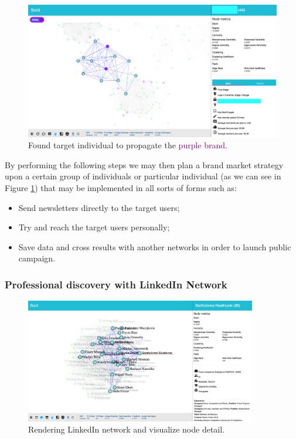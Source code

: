 \begin{figure}[h!]
\begin{center}
  \hspace*{-0.8in}
  \includegraphics[width=1.2\textwidth]{img/socii/socii_14.png}
\end{center}
\caption{\label{img:socii_14} Found target individual to propagate the \textcolor{purple}{purple brand}.}
\end{figure}

By performing the following steps we may then plan a brand market strategy upon a certain group of individuals or particular individual (as we can see in Figure \ref{img:socii_14}) that may be implemented in all sorts of forms such as:
\begin{itemize}
    \item Send newsletters directly to the target users;
    \item Try and reach the target users personally;
    \item Save data and cross results with another networks in order to launch public campaign.
\end{itemize}

\subsubsection{Professional discovery with LinkedIn Network}

\begin{figure}[h!]
\begin{center}
  \hspace*{-0.8in}
  \includegraphics[width=0.9\textwidth]{img/socii/socii_15.png}
\end{center}
\caption{\label{img:socii_15} Rendering LinkedIn network and visualize node detail.}
\end{figure}

